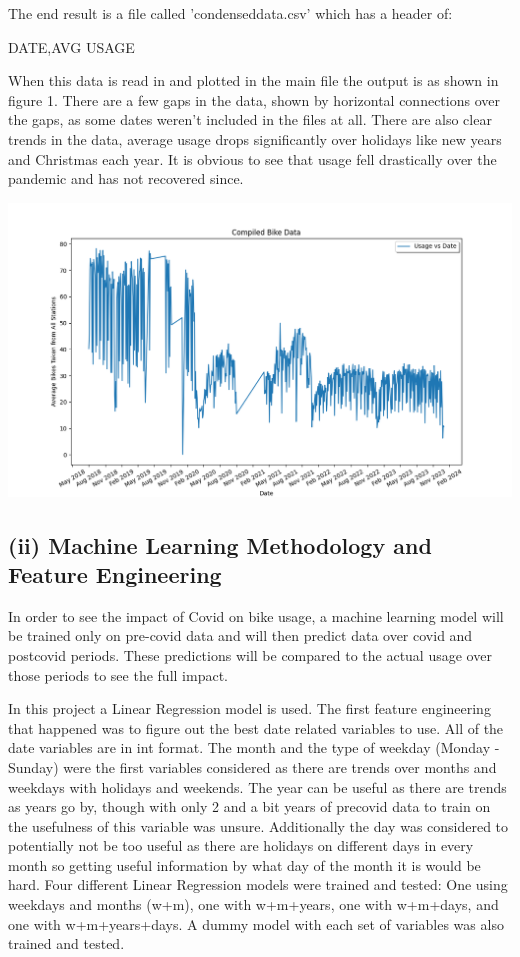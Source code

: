 \documentclass{article}
\begin{document}
The end result is a file called 'condenseddata.csv' which has a header of:
\begin{center}
DATE,AVG USAGE
\end{center}

When this data is read in and plotted in the main file the output is as shown in figure 1. There are a few gaps in the data, shown by horizontal connections over the gaps, as some dates weren't included in the files at all. There are also clear trends in the data, average usage drops significantly over holidays like new years and Christmas each year. It is obvious to see that usage fell drastically over the pandemic and has not recovered since.

\begin{center}
\includegraphics[width=1\linewidth]{CompiledData.png}
\end{center}

\subsection{(ii) Machine Learning Methodology and Feature Engineering}

In order to see the impact of Covid on bike usage, a machine learning model will be trained only on pre-covid data and will then predict data over covid and postcovid periods. These predictions will be compared to the actual usage over those periods to see the full impact.

In this project a Linear Regression model is used. The first feature engineering that happened was to figure out the best date related variables to use. All of the date variables are in int format. The month and the type of weekday (Monday - Sunday) were the first variables considered as there are trends over months and weekdays with holidays and weekends. The year can be useful as there are trends as years go by, though with only 2 and a bit years of precovid data to train on the usefulness of this variable was unsure. Additionally the day was considered to potentially not be too useful as there are holidays on different days in every month so getting useful information by what day of the month it is would be hard. Four different Linear Regression models were trained and tested: One using weekdays and months (w+m), one with w+m+years, one with w+m+days, and one with w+m+years+days. A dummy model with each set of variables was also trained and tested.
\end{document}
